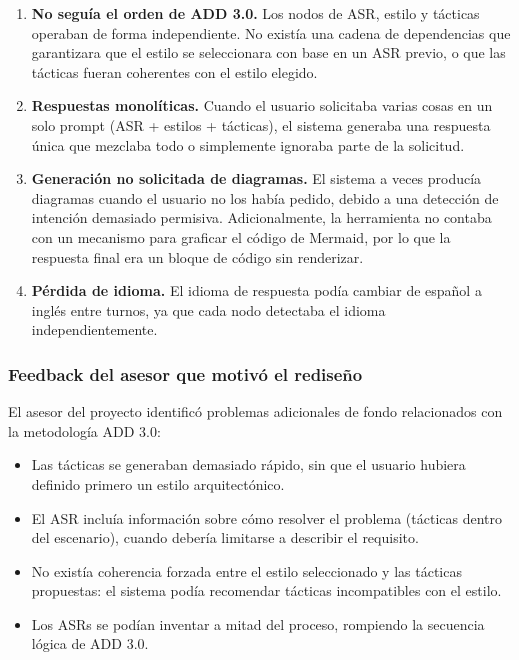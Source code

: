 \documentclass[12pt, letterpaper, oneside]{article}
\begin{document}
\begin{enumerate}
\item \textbf{No seguía el orden de ADD 3.0.} Los nodos de ASR, estilo y tácticas
operaban de forma independiente. No existía una cadena de dependencias que
garantizara que el estilo se seleccionara con base en un ASR previo, o que las
tácticas fueran coherentes con el estilo elegido.

\item \textbf{Respuestas monolíticas.} Cuando el usuario solicitaba varias cosas
en un solo prompt (ASR + estilos + tácticas), el sistema generaba una respuesta
única que mezclaba todo o simplemente ignoraba parte de la solicitud.

\item \textbf{Generación no solicitada de diagramas.} El sistema a veces producía
diagramas cuando el usuario no los había pedido, debido a una detección de
intención demasiado permisiva. Adicionalmente, la herramienta no contaba con un
mecanismo para graficar el código de Mermaid, por lo que la respuesta final era un bloque de código sin renderizar.

\item \textbf{Pérdida de idioma.} El idioma de respuesta podía cambiar de español
a inglés entre turnos, ya que cada nodo detectaba el idioma independientemente.
\end{enumerate}

\subsubsection{Feedback del asesor que motivó el rediseño}

El asesor del proyecto identificó problemas adicionales de fondo relacionados con
la metodología ADD 3.0:

\begin{itemize}
\item Las tácticas se generaban demasiado rápido, sin que el usuario hubiera
definido primero un estilo arquitectónico.

\item El ASR incluía información sobre cómo resolver el problema (tácticas
dentro del escenario), cuando debería limitarse a describir el requisito.

\item No existía coherencia forzada entre el estilo seleccionado y las tácticas
propuestas: el sistema podía recomendar tácticas incompatibles con el estilo.

\item Los ASRs se podían inventar a mitad del proceso, rompiendo la secuencia
lógica de ADD 3.0.
\end{itemize}
\end{document}
